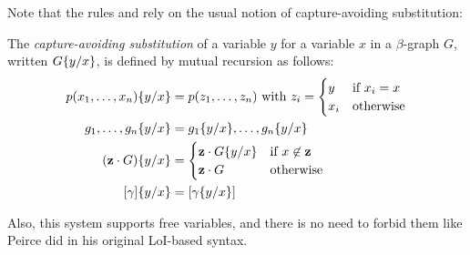 Note that the rules  and  rely on the usual notion
of capture-avoiding substitution:

\begin{definition}
  The \emph{capture-avoiding substitution} of a variable $y$ for a variable $x$
  in a $\beta$-graph $G$, written $G \{ y / x \}$, is defined by mutual
  recursion as follows:
  \begin{align*}
    \subst{p(x_1,\ldots,x_n)}{y}{x} &= p(z_1, \ldots, z_n) \text{ with } z_i = \begin{cases}
      y &\text{if $x_i = x$} \\
      x_i &\text{otherwise}
    \end{cases} \\
    \subst{g_1, \ldots, g_n}{y}{x} &= \subst{g_1}{y}{x}, \ldots, \subst{g_n}{y}{x} \\
    \subst{(\garden{\bz}{G})}{y}{x} &= \begin{cases}
      \garden{\bz}{\subst{G}{y}{x}} &\text{if $x \not\in \bz$} \\
      \garden{\bz}{G} &\text{otherwise}
    \end{cases} \\
    \subst{[\gamma]}{y}{x} &= [\subst{\gamma}{y}{x}]
  \end{align*}
\end{definition}

Also, this system supports free variables, and there is no need to forbid them
like Peirce did in his original LoI-based syntax.